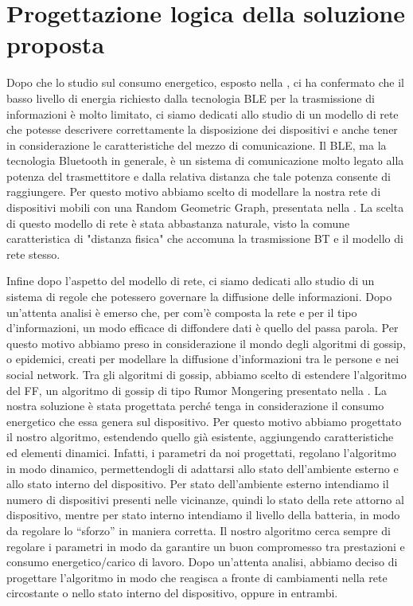\chapter{Progettazione logica della soluzione proposta}
\label{chap:Prog_log_sol}

Dopo che lo studio sul consumo energetico, esposto nella , ci ha confermato che il basso livello di energia richiesto dalla tecnologia \acs{BLE} per la trasmissione di informazioni è molto limitato, ci siamo dedicati allo studio di un modello di rete che potesse descrivere correttamente la disposizione dei dispositivi e anche tener in considerazione le caratteristiche del mezzo di comunicazione. Il \acs{BLE}, ma la tecnologia Bluetooth in generale, è un sistema di comunicazione molto legato alla potenza del trasmettitore e dalla relativa distanza che tale potenza consente di raggiungere. Per questo motivo abbiamo scelto di modellare la nostra rete di dispositivi mobili con una Random Geometric Graph, presentata nella . La scelta di questo modello di rete è stata abbastanza naturale, visto la comune caratteristica di "distanza fisica" che accomuna la trasmissione \acs{BT} e il modello di rete stesso.

Infine dopo l'aspetto del modello di rete, ci siamo dedicati allo studio di un sistema di regole che potessero governare la diffusione delle informazioni. Dopo un'attenta analisi è emerso che, per com'è composta la rete e per il tipo d'informazioni, un modo efficace di diffondere dati è quello del passa parola. Per questo motivo abbiamo preso in considerazione il mondo degli algoritmi di gossip, o epidemici, creati per modellare la diffusione d'informazioni tra le persone e nei social network. Tra gli algoritmi di gossip, abbiamo scelto di estendere l'algoritmo del \acl{FF}, un algoritmo di gossip di tipo Rumor Mongering presentato nella . La nostra soluzione è stata progettata perché tenga in considerazione il consumo energetico che essa genera sul dispositivo. Per questo motivo abbiamo progettato il nostro algoritmo, estendendo quello già esistente, aggiungendo caratteristiche ed elementi dinamici. Infatti, i parametri da noi progettati, regolano l'algoritmo in modo dinamico, permettendogli di adattarsi allo stato dell'ambiente esterno e allo stato interno del dispositivo. Per stato dell'ambiente esterno intendiamo il numero di dispositivi presenti nelle vicinanze, quindi lo stato della rete attorno al dispositivo, mentre per stato interno intendiamo il livello della batteria, in modo da regolare lo “sforzo” in maniera corretta. Il nostro algoritmo cerca sempre di regolare i parametri in modo da garantire un buon compromesso tra prestazioni e consumo energetico/carico di lavoro. Dopo un'attenta analisi, abbiamo deciso di progettare l'algoritmo in modo che reagisca a fronte di cambiamenti nella rete circostante o nello stato interno del dispositivo, oppure in entrambi.
\bigskip

